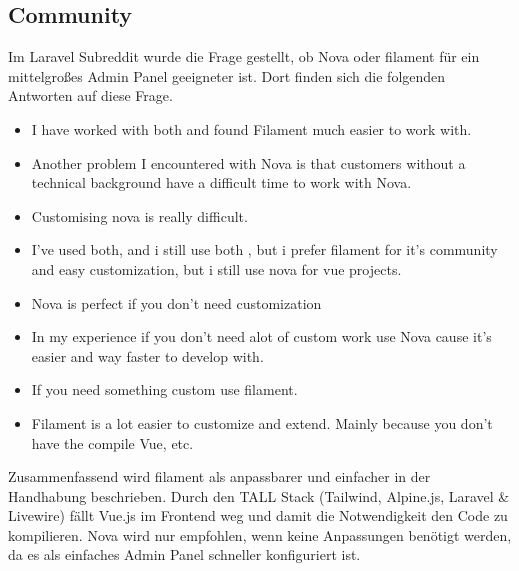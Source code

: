 \subsection{Community}
Im Laravel Subreddit wurde die Frage gestellt, ob Nova oder filament für ein mittelgroßes Admin Panel geeigneter ist\cite{reddit-laravel-nova-vs-filament}.
Dort finden sich die folgenden Antworten auf diese Frage.

\begin{itemize}
    \item I have worked with both and found Filament much easier to work with.
    \item Another problem I encountered with Nova is that customers without a technical background have a difficult time to work with Nova.
    \item Customising nova is really difficult.
    \item I've used both, and i still use both , but i prefer filament for it's community and easy customization, but i still use nova for vue projects.
    \item Nova is perfect if you don't need customization
    \item In my experience if you don’t need alot of custom work use Nova cause it’s easier and way faster to develop with.
    \item If you need something custom use filament.
    \item Filament is a lot easier to customize and extend. Mainly because you don’t have the compile Vue, etc.
\end{itemize}

Zusammenfassend wird filament als anpassbarer und einfacher in der Handhabung beschrieben.
Durch den TALL Stack (Tailwind, Alpine.js, Laravel \& Livewire) fällt Vue.js im Frontend weg und damit die Notwendigkeit den Code zu kompilieren.
Nova wird nur empfohlen, wenn keine Anpassungen benötigt werden, da es als einfaches Admin Panel schneller konfiguriert ist.
